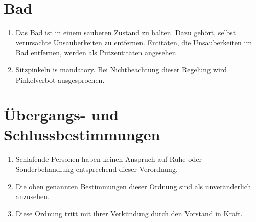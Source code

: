 \documentclass[12pt,a4paper]{scrartcl}
\begin{document}
\section{Bad}
\begin{enumerate}
  \item Das Bad ist in einem sauberen Zustand zu halten. Dazu gehört, selbst
    verursachte Unsauberkeiten zu entfernen. Entitäten, die Unsauberkeiten im
    Bad entfernen, werden als Putzentitäten angesehen.

  \item Sitzpinkeln is mandatory. Bei Nichtbeachtung dieser Regelung wird
    Pinkelverbot ausgesprochen.
\end{enumerate}

\section{Übergangs- und Schlussbestimmungen}
\begin{enumerate}
  \item Schlafende Personen haben keinen Anspruch auf Ruhe oder Sonderbehandlung
    entsprechend dieser Verordnung.

  \item Die oben genannten Bestimmungen dieser Ordnung sind als unveränderlich
    anzusehen.

  \item Diese Ordnung tritt mit ihrer Verkündung durch den Vorstand in Kraft.
\end{enumerate}
\end{document}
